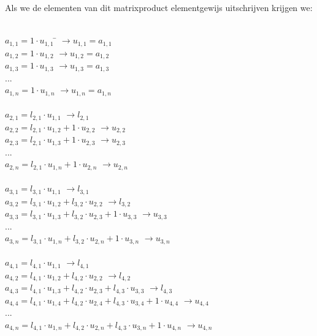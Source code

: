 \documentclass[a4paper]{article}
\begin{document}
\begin{minipage}[c]{\textwidth}
Als we de elementen van dit matrixproduct elementgewijs uitschrijven krijgen we:
\begin{tabbing} %
\\$a_{1,1} = 1 \cdot u_{1,1}$\hspace{6.0cm} \= $\rightarrow  u_{1,1} = a_{1,1}$
\\$a_{1,2} = 1 \cdot u_{1,2}$ \> $\rightarrow  u_{1,2}= a_{1,2}$
\\$a_{1,3} = 1 \cdot u_{1,3}$ \> $\rightarrow  u_{1,3}= a_{1,3}$
\\ {...}
\\$a_{1,n} = 1 \cdot u_{1,n}$ \> $\rightarrow  u_{1,n}= a_{1,n}$
\\ {}
\\$a_{2,1} = l_{2,1} \cdot u_{1,1}$ \> $\rightarrow l_{2,1}$
\\$a_{2,2} = l_{2,1} \cdot u_{1,2} + 1 \cdot u_{2,2}$ \> $\rightarrow u_{2,2}$
\\$a_{2,3} = l_{2,1} \cdot u_{1,3} + 1 \cdot u_{2,3}$ \> $\rightarrow u_{2,3}$
\\{...}
\\$a_{2,n} = l_{2,1} \cdot u_{1,n} + 1 \cdot u_{2,n}$ \> $\rightarrow u_{2,n}$
\\{}
\\$a_{3,1} = l_{3,1} \cdot u_{1,1}$ \> $\rightarrow l_{3,1}$
\\$a_{3,2} = l_{3,1} \cdot u_{1,2} +  l_{3,2} \cdot u_{2,2}$ \> $\rightarrow l_{3,2}$
\\$a_{3,3} = l_{3,1} \cdot u_{1,3} +  l_{3,2} \cdot u_{2,3} + 1 \cdot u_{3,3}$ \> $\rightarrow u_{3,3}$
\\{...}
\\$a_{3,n} = l_{3,1} \cdot u_{1,n} +  l_{3,2} \cdot u_{2,n} + 1 \cdot u_{3,n}$ \> $\rightarrow u_{3,n}$
\\{}
\\$a_{4,1} = l_{4,1} \cdot u_{1,1}$ \> $\rightarrow l_{4,1}$
\\$a_{4,2} = l_{4,1} \cdot u_{1,2} +  l_{4,2} \cdot u_{2,2}$ \> $\rightarrow l_{4,2}$
\\$a_{4,3} = l_{4,1} \cdot u_{1,3} +  l_{4,2} \cdot u_{2,3} + l_{4,3} \cdot u_{3,3}$ \> $\rightarrow l_{4,3}$
\\$a_{4,4} = l_{4,1} \cdot u_{1,4} +  l_{4,2} \cdot u_{2,4} + l_{4,3} \cdot u_{3,4} + 1 \cdot u_{4,4}$ \> $\rightarrow u_{4,4}$
\\{...}
\\$a_{4,n} = l_{4,1} \cdot u_{1,n} +  l_{4,2} \cdot u_{2,n} + l_{4,3} \cdot u_{3,n} + 1 \cdot u_{4,n}$ \> $\rightarrow u_{4,n}$
\\{}
\end{tabbing}
\end{minipage}
\end{document}
